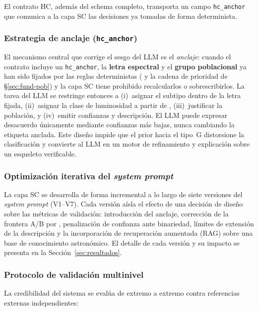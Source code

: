El contrato HC, además del schema completo, transporta un campo \verb|hc_anchor|
que comunica a la capa SC las decisiones ya tomadas de forma determinista.

\subsubsection{Estrategia de anclaje (\texttt{hc\_anchor})}
\label{sec:metodo-anclaje}

El mecanismo central que corrige el sesgo del LLM es el \emph{anclaje}: cuando el
contrato incluye un \verb|hc_anchor|, la \textbf{letra espectral} y el
\textbf{grupo poblacional} ya han sido fijados por las reglas deterministas
( y la cadena de prioridad de §\ref{sec:fund-pob}) y la capa
SC tiene prohibido recalcularlos o sobrescribirlos. La tarea del LLM se restringe
entonces a (i)~asignar el subtipo dentro de la letra fijada, (ii)~asignar la clase
de luminosidad a partir de \logg{}, (iii)~justificar la población, y (iv)~emitir
confianzas y descripción. El LLM puede expresar desacuerdo únicamente mediante
confianzas más bajas, nunca cambiando la etiqueta anclada. Este diseño impide que
el prior hacia el tipo~G distorsione la clasificación y convierte al LLM en un
motor de refinamiento y explicación sobre un esqueleto verificable.

\subsubsection{Optimización iterativa del \emph{system prompt}}
\label{sec:metodo-prompt}

La capa SC se desarrolla de forma incremental a lo largo de siete versiones del
\emph{system prompt} (V1--V7). Cada versión aísla el efecto de una decisión de
diseño sobre las métricas de validación: introducción del anclaje, corrección de
la frontera A/B por \logg{}, penalización de confianza ante binariedad, límites de
extensión de la descripción y la incorporación de recuperación aumentada
(RAG) sobre una base de conocimiento astronómico. El detalle de cada versión y su
impacto se presenta en la Sección~\ref{sec:resultados}.

\subsubsection{Protocolo de validación multinivel}
\label{sec:metodo-validacion}

La credibilidad del sistema se evalúa de extremo a extremo contra referencias
externas independientes:

